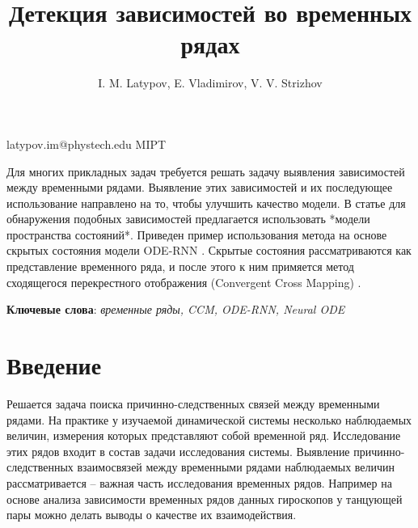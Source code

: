 \documentclass[12pt, twoside]{article}
\begin{document}
\title
	[Детекция зависимостей во временных рядах]
	{Детекция зависимостей во временных рядах}
\author
	[I. M. Latypov]
	{I. M. Latypov, E. Vladimirov, V. V. Strizhov}
\email
	{latypov.im@phystech.edu}
\organization	
	{MIPT}	
\abstract
	{
		Для многих прикладных задач \cite{Averta2021}\cite{Camargo2021}\cite{Higuchi1999} требуется решать задачу выявления зависимостей между временными рядами. 
		Выявление этих зависимостей и их последующее использование направлено на то, чтобы улучшить качество модели. В статье для обнаружения подобных зависимостей предлагается использовать *модели пространства состояний*. Приведен пример использования метода на основе скрытых состояния модели ODE-RNN \cite{Rubanova2019}. Скрытые состояния рассматриваются как представление временного ряда, и после этого к ним примяется метод сходящегося перекрестного отображения (Convergent Cross Mapping) \cite{Sugihara2012}.
		
		}
\bigskip
\noindent

\maketitle
\textbf{Ключевые слова}: \emph{временные ряды, CCM, ODE-RNN, Neural ODE}

\section{Введение}
		Решается задача поиска причинно-следственных связей между временными рядами. На практике у изучаемой динамической системы несколько наблюдаемых величин,
		 измерения которых представляют собой временной ряд. 
		Исследование этих рядов входит в состав задачи исследования системы. Выявление причинно-следственных взаимосвязей между временными рядами наблюдаемых величин рассматривается -- важная часть исследования временных рядов. Например на основе анализа зависимости временных рядов данных гироскопов у танцующей пары можно делать выводы о качестве их взаимодействия.
		
		
\end{document}
